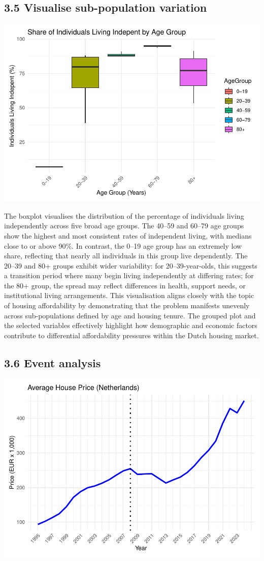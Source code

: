 \documentclass[
]{article}
\begin{document}
\subsection{3.5 Visualise sub-population
variation}\label{visualise-sub-population-variation}

\begin{center}\includegraphics[width=0.52\linewidth,height=0.3\textheight]{rMarkdownProgrammingForEconomistsTutorial1Group6_files/figure-latex/visualise subpopulations-1} \end{center}

The boxplot visualises the distribution of the percentage of individuals
living independently across five broad age groups. The 40--59 and 60--79
age groups show the highest and most consistent rates of independent
living, with medians close to or above 90\%. In contrast, the 0--19 age
group has an extremely low share, reflecting that nearly all individuals
in this group live dependently. The 20--39 and 80+ groups exhibit wider
variability: for 20--39-year-olds, this suggests a transition period
where many begin living independently at differing rates; for the 80+
group, the spread may reflect differences in health, support needs, or
institutional living arrangements. This visualisation aligns closely
with the topic of housing affordability by demonstrating that the
problem manifests unevenly across sub-populations defined by age and
housing tenure. The grouped plot and the selected variables effectively
highlight how demographic and economic factors contribute to
differential affordability pressures within the Dutch housing market.

\subsection{3.6 Event analysis}\label{event-analysis}

\begin{center}\includegraphics[width=0.52\linewidth,height=0.3\textheight]{rMarkdownProgrammingForEconomistsTutorial1Group6_files/figure-latex/event-analysis-1} \end{center}
\end{document}
